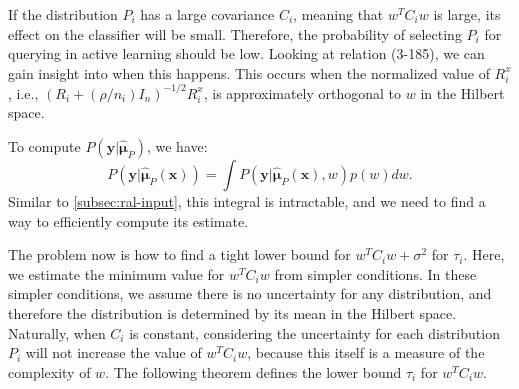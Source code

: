 \documentclass[12pt]{article}
\begin{document}
	If the distribution $P_i$ has a large covariance $C_i$, meaning that $w^T C_i w$ is large, its effect on the classifier will be small. Therefore, the probability of selecting $P_i$ for querying in active learning should be low. Looking at relation (3-185), we can gain insight into when this happens. This occurs when the normalized value of $R_i^x$, i.e., $(R_i + (\rho/n_i) I_n)^{-1/2} R_i^x$, is approximately orthogonal to $w$ in the Hilbert space.
	
	To compute $P(\mathbf{y}|\hat{\boldsymbol{\mu}}_P)$, we have:
	\begin{equation}
		P(\mathbf{y}|\hat{\boldsymbol{\mu}}_P(\mathbf{x})) = \int P(\mathbf{y}|\hat{\boldsymbol{\mu}}_P(\mathbf{x}), w) p(w) dw.
	\end{equation}
	Similar to \ref{subsec:ral-input}, this integral is intractable, and we need to find a way to efficiently compute its estimate.
	
	The problem now is how to find a tight lower bound for $w^T C_i w + \sigma^2$ for $\tau_i$. Here, we estimate the minimum value for $w^T C_i w$ from simpler conditions. In these simpler conditions, we assume there is no uncertainty for any distribution, and therefore the distribution is determined by its mean in the Hilbert space. Naturally, when $C_i$ is constant, considering the uncertainty for each distribution $P_i$ will not increase the value of $w^T C_i w$, because this itself is a measure of the complexity of $w$. The following theorem defines the lower bound $\tau_i$ for $w^T C_i w$.
	
\end{document}
